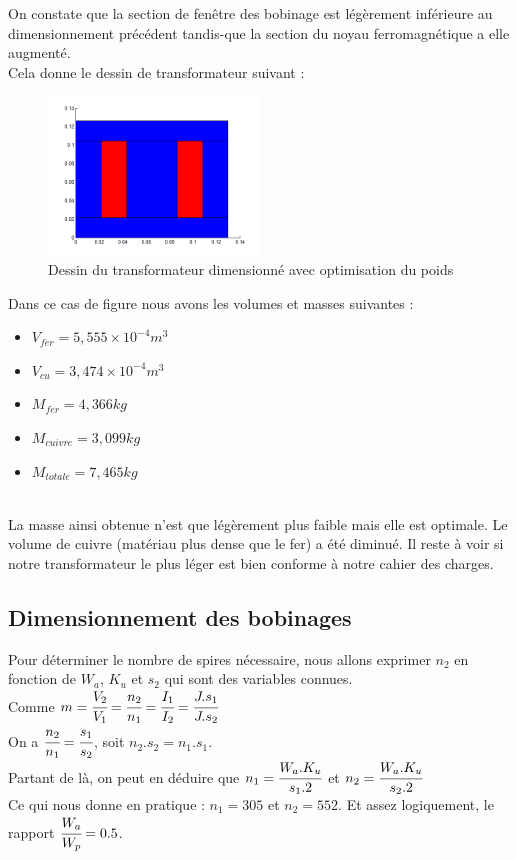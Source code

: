 On constate que la section de fenêtre des bobinage est légèrement inférieure au dimensionnement précédent tandis-que la section du noyau ferromagnétique a elle augmenté.\\

\newpage
Cela donne le dessin de transformateur suivant :\\
\begin{figure}[h]
	\begin{center}
	\includegraphics[width=0.5\textwidth]{images/TP1_transfo_poids}
	\caption{Dessin du transformateur dimensionné avec optimisation du poids}\label{img:dessinTransfoPoids}
	\end{center}
\end{figure}
\FloatBarrier 

Dans ce cas de figure nous avons les volumes et masses suivantes : \\
\begin{itemize}
\item $V_{fer} = 5,555 \times{}10^{-4} m^3$
\item $V_{cu} = 3,474 \times{}10^{-4} m^3$
\item $M_{fer} = 4,366 kg$
\item $M_{cuivre} = 3,099 kg $
\item $M_{totale} = 7,465 kg $
\end{itemize}~\\

La masse ainsi obtenue n'est que légèrement plus faible mais elle est optimale. Le volume de cuivre (matériau plus dense que le fer) a été diminué. Il reste à voir si notre transformateur le plus léger est bien conforme à notre cahier des charges.\\

\subsection{Dimensionnement des bobinages}
Pour déterminer le nombre de spires nécessaire, nous allons exprimer $n_2$ en fonction de $W_a$, $K_u$ et $s_2$ qui sont des variables connues.\\
Comme $ m = \cfrac{V_2}{V_1} = \cfrac{n_2}{n_1} = \cfrac{I_1}{I_2} = \cfrac{J.s_1}{J.s_2}$ \\
On a $ \cfrac{n_2}{n_1} = \cfrac{s_1}{s_2} $, soit $ n_2.s_2 = n_1.s_1 $.\\
Partant de là, on peut en déduire que $n_1 = \cfrac{W_a.K_u}{s_1.2}$ et $n_2 = \cfrac{W_a.K_u}{s_2.2}$\\
Ce qui nous donne en pratique : $n_1 = 305$ et $n_2 = 552$. Et assez logiquement, le rapport $\cfrac{W_a}{W_p}=0.5$.
	
